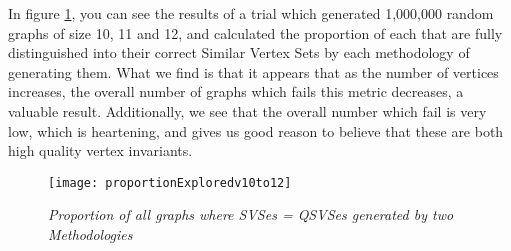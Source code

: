 In figure \ref{fig:proportionQSVSeqSVS}, you can see the results of a trial which generated 1,000,000 random graphs of size 10, 11 and 12, and calculated the proportion of each that are fully distinguished into their correct Similar Vertex Sets by each methodology of generating them.
What we find is that it appears that as the number of vertices increases, the overall number of graphs which fails this metric decreases, a valuable result.
Additionally, we see that the overall number which fail is very low, which is heartening, and gives us good reason to believe that these are both high quality vertex invariants.

\begin{figure}[h]
\caption{\emph{Proportion of all graphs where SVSes = QSVSes generated by two Methodologies}}
\centering
\texttt{[image: proportionExploredv10to12]}
\label{fig:proportionQSVSeqSVS}
\end{figure}



